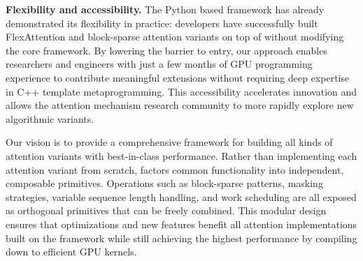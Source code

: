 \textbf{Flexibility and accessibility.}
The Python based framework has already demonstrated its flexibility in practice: developers have successfully built FlexAttention and block-sparse attention variants on top of \faf without modifying the core framework. By lowering the barrier to entry, our approach enables researchers and engineers with just a few months of GPU programming experience to contribute meaningful extensions without requiring deep expertise in C++ template metaprogramming. This accessibility accelerates innovation and allows the attention mechanism research community to more rapidly explore new algorithmic variants.

Our vision is to provide a comprehensive framework for building all kinds of attention variants with best-in-class performance. Rather than implementing each attention variant from scratch, \faf factors common functionality into independent, composable primitives. Operations such as block-sparse patterns, masking strategies, variable sequence length handling, and work scheduling are all exposed as orthogonal primitives that can be freely combined. This modular design ensures that optimizations and new features benefit all attention implementations built on the framework while still achieving the highest performance by compiling down to efficient GPU kernels.
